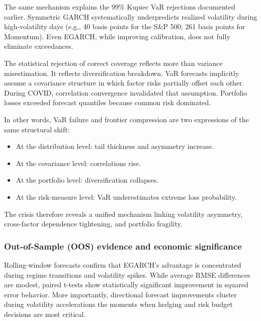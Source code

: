 \documentclass{article}
\begin{document}
The same mechanism explains the 99\% Kupiec VaR rejections documented earlier. Symmetric GARCH systematically underpredicts realized volatility during high-volatility days (e.g., 40 basis points for the S\&P 500; 261 basis points for Momentum). Even EGARCH, while improving calibration, does not fully eliminate exceedances.\newline

The statistical rejection of correct coverage reflects more than variance misestimation. It reflects diversification breakdown. VaR forecasts implicitly assume a covariance structure in which factor risks partially offset each other. During COVID, correlation convergence invalidated that assumption. Portfolio losses exceeded forecast quantiles because common risk dominated.\newline

In other words, VaR failure and frontier compression are two expressions of the same structural shift:\newline

\begin{itemize}
\item At the distribution level: tail thickness and asymmetry increase.
\item At the covariance level: correlations rise.
\item At the portfolio level: diversification collapses.
\item At the risk-measure level: VaR underestimates extreme loss probability.
\end{itemize}

The crisis therefore reveals a unified mechanism linking volatility asymmetry, cross-factor dependence tightening, and portfolio fragility.\newline

\subsubsection{Out-of-Sample (OOS) evidence and economic significance}

Rolling-window forecasts confirm that EGARCH’s advantage is concentrated during regime transitions and volatility spikes. While average RMSE differences are modest, paired t-tests show statistically significant improvement in squared error behavior. More importantly, directional forecast improvements cluster during volatility accelerations the moments when hedging and risk budget decisions are most critical. \newline
\end{document}
